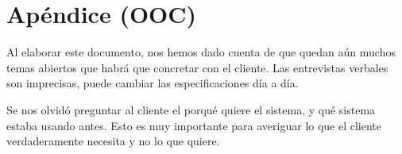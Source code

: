\section{Apéndice (OOC)}
Al elaborar este documento, nos hemos dado cuenta de que quedan aún muchos temas abiertos que habrá que concretar con el cliente.
Las entrevistas verbales son imprecisas, puede cambiar las especificaciones día a día.

Se nos olvidó preguntar al cliente el porqué quiere el sistema, y qué sistema estaba usando antes. Esto es muy importante para averiguar lo que el cliente verdaderamente necesita y no lo que quiere. 

